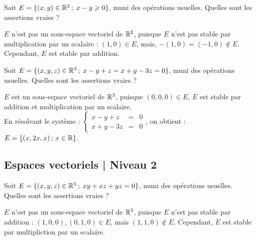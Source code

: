 \begin{question}

Soit $E=\{(x,y)\in \mathbb{R}^2  \, ; \; x-y\geqslant 0\}$, muni des opérations usuelles. Quelles sont les assertions vraies ?
\begin{answers}  
\end{answers}
\begin{explanations}
$E$ n'est pas un sous-espace vectoriel de $\mathbb{R}^2$, puisque $E$ n'est pas stable par multiplication par un scalaire : 
$(1,0) \in E$, mais,  $-(1,0)=(-1,0) \notin E $. Cependant, $E$ est stable par addition.
\end{explanations}
\end{question}


\begin{question}
Soit $E=\{(x,y,z) \in \mathbb{R}^3 \, ; \;  x-y+z = x+y-3z=0\}$, muni des opérations usuelles. Quelles sont les assertions vraies ?
\begin{answers}  
\end{answers}
\begin{explanations}
$E$ est un sous-espace vectoriel de $\mathbb{R}^3$, puisque $(0,0,0)\in E$, $E$ est stable par addition et multiplication par un scalaire.\\
En résolvant le système  : $\left\{\begin{array}{rcc}
x-y+z&=&0\\
x+y-3z&=&0\end{array}\right.$, on obtient : $E=\{(x,2x,x)  \, ; \,  x\in \mathbb{R} \}$.
\end{explanations}
\end{question}


\subsection{Espaces vectoriels | Niveau 2}

\begin{question}
Soit $E=\{(x,y,z) \in \mathbb{R}^3 \, ; \;  xy+xz+yz = 0\}$, muni des opérations usuelles. Quelles sont les assertions vraies ?
\begin{answers}  
\end{answers}
\begin{explanations}
$E$ n'est pas un sous-espace vectoriel de $\mathbb{R}^3$, puisque $E$ n'est pas stable par addition : 
$(1,0,0), (0,1,0) \in E$, mais $(1,1,0) \notin E$. Cependant, $E$ est stable par multipliction par un scalaire.
\end{explanations}
\end{question}


